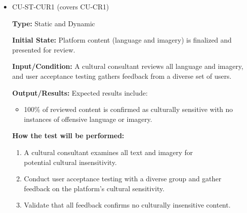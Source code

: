 \documentclass[12pt, titlepage]{article}
\begin{document}
\begin{itemize} 
  \item CU-ST-CUR1 (covers CU-CR1)
  \begin{mdframed}[linewidth=0.5mm] 
    \textbf{Type:} Static and Dynamic \par 
    \textbf{Initial State:} Platform content (language and imagery) is finalized and presented for review. \par 
    \textbf{Input/Condition:} A cultural consultant reviews all language and imagery, and user acceptance testing gathers feedback from a diverse set of users. \par 
    \textbf{Output/Results:} Expected results include: 
    \begin{itemize} 
      \item 100\% of reviewed content is confirmed as culturally sensitive with no instances of offensive language or imagery. 
    \end{itemize} \par 
    \textbf{How the test will be performed:} 
    \begin{enumerate}[noitemsep] 
      \item A cultural consultant examines all text and imagery for \\potential cultural insensitivity. 
      \item Conduct user acceptance testing with a diverse group and gather feedback on the platform's cultural sensitivity. 
      \item Validate that all feedback confirms no culturally insensitive content. 
    \end{enumerate} 
  \end{mdframed}


\end{itemize}
\end{document}

